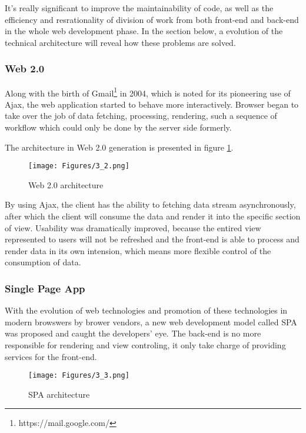 It's really significant to improve the maintainability of code, as well as the efficiency and resrationality of division of work from both front-end and back-end in the whole web development phase. In the section below, a evolution of the technical architecture will reveal how these problems are solved.

\subsubsection{Web 2.0}
Along with the birth of Gmail\footnote{https://mail.google.com/} in 2004, which is noted for its pioneering use of \gls{Ajax}, the web application started to behave more interactively. Browser began to take over the job of data fetching, processing, rendering, such a sequence of workflow which could only be done by the server side formerly.

The architecture in Web 2.0 generation is presented in figure \ref{fig:3.2}.

\begin{figure}[!htbp]
  \caption{Web 2.0 architecture}
  \centering
    \texttt{[image: Figures/3\_2.png]}
  \label{fig:3.2}
\end{figure}

By using Ajax, the client has the ability to fetching data stream asynchronously, after which the client will consume the data and render it into the specific section of view. Usability was dramatically improved, because the entired view represented to users will not be refreshed and the front-end is able to process and render data in its own intension, which means more flexible control of the consumption of data.

\subsubsection{Single Page App}

With the evolution of web technologies and promotion of these technologies in modern browswers by brower vendors, a new web development model called \gls{SPA} was proposed and caught the developers' eye. The back-end is no more responsible for rendering and view controling, it only take charge of providing services for the front-end.

\begin{figure}[!htbp]
  \caption{SPA architecture}
  \centering
    \texttt{[image: Figures/3\_3.png]}
  \label{fig:3.3}
\end{figure}

